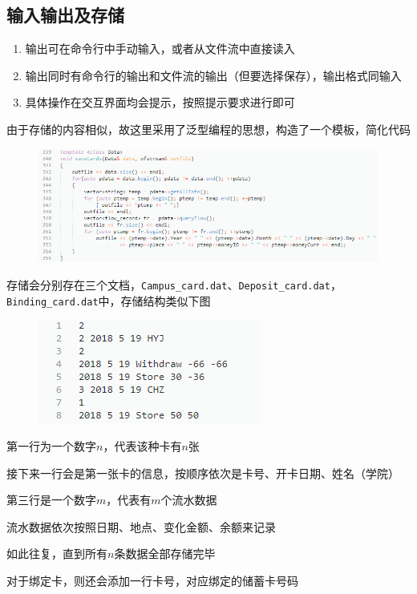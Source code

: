 \documentclass[11pt,UTF8]{ctexart}
\begin{document}
\subsection{输入输出及存储}
\begin{enumerate}
	\item 输出可在命令行中手动输入，或者从文件流中直接读入
	\item 输出同时有命令行的输出和文件流的输出（但要选择保存），输出格式同输入
	\item 具体操作在交互界面均会提示，按照提示要求进行即可
\end{enumerate}
\par 由于存储的内容相似，故这里采用了泛型编程的思想，构造了一个模板，简化代码
\begin{figure}[H]
\centering
\includegraphics[width=0.9\linewidth]{pic/template.PNG}
\end{figure}

\par 存储会分别存在三个文档，\verb'Campus_card.dat'、\verb'Deposit_card.dat'，\verb'Binding_card.dat'中，存储结构类似下图
\begin{figure}[H]
\centering
\includegraphics[width=0.4\linewidth]{pic/store.PNG}
\end{figure}
\par 第一行为一个数字$n$，代表该种卡有$n$张
\par 接下来一行会是第一张卡的信息，按顺序依次是卡号、开卡日期、姓名（学院）
\par 第三行是一个数字$m$，代表有$m$个流水数据
\par 流水数据依次按照日期、地点、变化金额、余额来记录
\par 如此往复，直到所有$n$条数据全部存储完毕
\par 对于绑定卡，则还会添加一行卡号，对应绑定的储蓄卡号码
\end{document}
